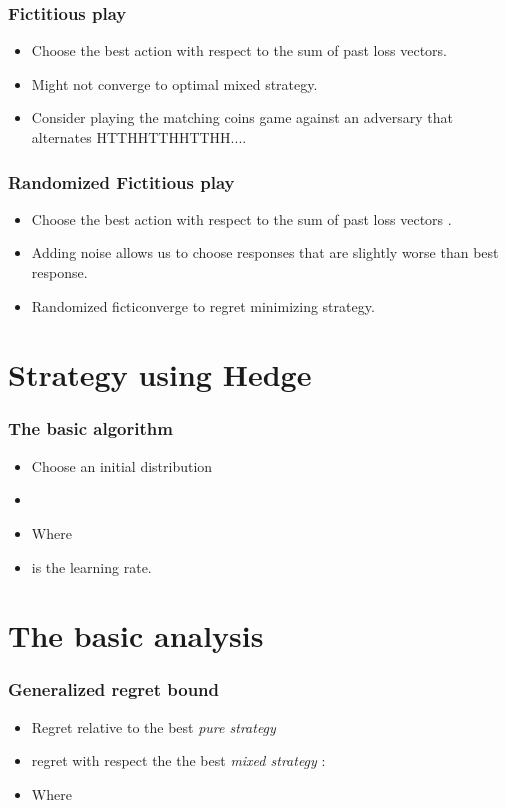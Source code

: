 \documentclass[handout]{beamer}
\begin{document}
\begin{frame}
\frametitle{Fictitious play}
\begin{itemize}
\item Choose the best action with respect to the sum of past loss vectors.
\item Might not converge to optimal mixed strategy.
\item Consider playing the matching coins game against an adversary
  that alternates HTTHHTTHHTTHH....
\end{itemize}
\end{frame}

\begin{frame}
\frametitle{Randomized Fictitious play}
\begin{itemize}
\item Choose the best action with respect to the sum of past loss
  vectors .
\item Adding noise allows us to choose responses that are slightly
  worse than best response.
\item {} Randomized ficticonverge to regret minimizing strategy.
\end{itemize}
\end{frame}


\section{Strategy using Hedge}

\begin{frame}
\frametitle{The basic algorithm}
\begin{itemize}
\item Choose an initial distribution 
\item {}
\item Where 
\item {} is the learning rate.
\end{itemize}
\end{frame}

\section{The basic analysis}

\begin{frame}
  \frametitle{Generalized regret bound}
  \begin{itemize}
  \item Regret relative to the best {\em pure strategy}
\item    regret with respect the the best {\em mixed strategy}
    \R{$\P$}:
    \item \small{Where }
\end{itemize}
\end{frame}
\end{document}
